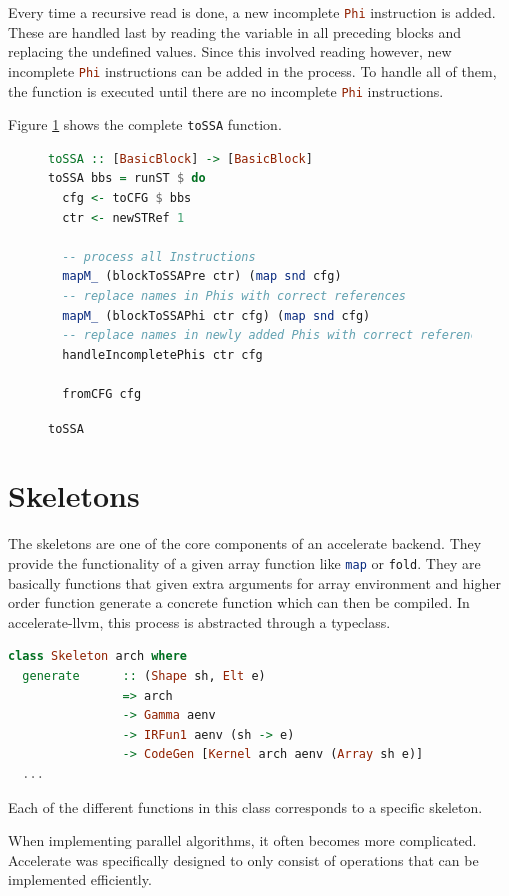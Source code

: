 \documentclass[a4paper,bibliography=totocnumbered,parskip,headsepline]{scrbook}
\begin{document}
Every time a recursive read is done, a new incomplete \lstinline[language=haskell]!Phi! instruction is added.
These are handled last by reading the variable in all preceding blocks and replacing the undefined values.
Since this involved reading however, new incomplete \lstinline[language=haskell]!Phi! instructions can be added in the process.
To handle all of them, the function is executed until there are no incomplete \lstinline[language=haskell]!Phi! instructions.

Figure \ref{fig:tossa} shows the complete \lstinline[language=haskell]!toSSA! function.

\begin{figure}
\begin{lstlisting}[language=haskell]
toSSA :: [BasicBlock] -> [BasicBlock]
toSSA bbs = runST $ do
  cfg <- toCFG $ bbs
  ctr <- newSTRef 1

  -- process all Instructions
  mapM_ (blockToSSAPre ctr) (map snd cfg)
  -- replace names in Phis with correct references
  mapM_ (blockToSSAPhi ctr cfg) (map snd cfg)
  -- replace names in newly added Phis with correct references
  handleIncompletePhis ctr cfg

  fromCFG cfg
\end{lstlisting}
\caption{\lstinline[language=haskell]!toSSA!}
\label{fig:tossa}
\end{figure}

\chapter{Skeletons}
The skeletons are one of the core components of an accelerate backend.
They provide the functionality of a given array function like \lstinline[language=haskell]!map! or \lstinline[language=haskell]!fold!.
They are basically functions that given extra arguments for array environment and higher order function generate a concrete function which can then be compiled.
In accelerate-llvm, this process is abstracted through a typeclass.
\begin{lstlisting}[language=haskell]
class Skeleton arch where
  generate      :: (Shape sh, Elt e)
                => arch
                -> Gamma aenv
                -> IRFun1 aenv (sh -> e)
                -> CodeGen [Kernel arch aenv (Array sh e)]
  ...
\end{lstlisting}
Each of the different functions in this class corresponds to a specific skeleton.

When implementing parallel algorithms, it often becomes more complicated.
Accelerate was specifically designed to only consist of operations that can be implemented efficiently.
\end{document}
